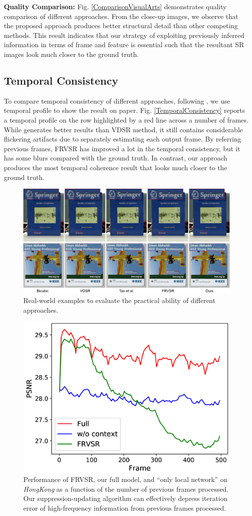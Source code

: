 \documentclass[letterpaper]{article} %
\begin{document}
\textbf{Quality Comparison:} Fig. \ref{ComparisonVisualArts} demonstrates quality comparison of different approaches. From the close-up images, we observe that the proposed approach produces better structural detail than other competing methods. This result indicates that our strategy of exploiting previously inferred information in terms of frame and feature is essential such that the resultant SR images look much closer to the ground truth.



\subsection{Temporal Consistency}

To compare temporal consistency of different approaches, following \cite{VESPCN2017cvpr}, we use temporal profile to show the result on paper. Fig. \ref{TemporalConsistency} reports a temporal profile on the row highlighted by a red line across a number of frames. While \cite{Tao2017iccv} generates better results than VDSR method, it still contains considerable flickering artifacts due to separately estimating each output frame. By referring previous frames, FRVSR has improved a lot in the temporal consistency, but it has some blurs compared with the ground truth. In contrast, our approach produces the most temporal coherence result that looks much closer to the ground truth.



\begin{figure}[t]
\centering
\includegraphics[width=8 cm]{Fig9.png}
\caption{Real-world examples to evaluate the practical ability of different approaches.}
\label{RealWorldExamples}
\end{figure}





\vspace{-2.66mm}
\begin{figure}[t]
\centering
\includegraphics[width=6.1 cm]{Fig11.png}
\caption{Performance of FRVSR, our full model, and ``only local network'' on \textit{HongKong} as a function of the number of previous frames processed. Our suppression-updating algorithm can effectively depress iteration error of high-frequency information from previous frames processed.}
\label{SuppressingCurve}
\end{figure}
\end{document}
